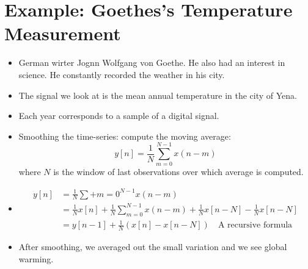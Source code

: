 \documentclass[../main.tex]{subfiles}
\begin{document}
\section{Example: Goethes's Temperature Measurement}
\begin{itemize}
    \item German wirter Jognn Wolfgang von Goethe. He also had an interest in science. He constantly recorded the weather in his city.
    \item The signal we look at is the mean annual temperature in the city of Yena. 
    \item Each year corresponds to a sample of a digital signal.
    \item Smoothing the time-series: compute the moving average: \[
    y[n]=\frac{1}{N}\sum_{m=0}^{N-1}x(n-m)
    \] where $N$ is the window of last observations over which average is computed.
    \item \begin{align*}
        y[n] &= \frac{1}{N}\sum+{m=0}^{N-1}x(n-m)\\
        &=\frac{1}{N}x[n] + \frac{1}{N}\sum_{m=0}^{N-1}x(n-m) + \frac{1}{N}x[n-N]-\frac{1}{N}x[n-N]\\
        &=y[n-1]+\frac{1}{N}(x[n]-x[n-N]) \quad \text{A recursive formula}
    \end{align*}
    \item After smoothing, we averaged out the small variation and we see global warming.
\end{itemize}
\end{document}
